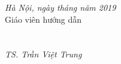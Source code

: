 \begin{enumerate}
\begin{flushright}
	\textit{Hà Nội, ngày \space \space \space tháng \space \space \space năm 2019}
	\\ Giáo viên hướng dẫn~~~~~~~~~~~
	\\~
	\\~
	\\ \textit{TS. Trần Việt Trung~~~~~~~~~}
\end{flushright}
\end{enumerate}
